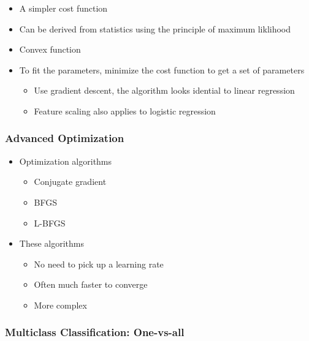 \documentclass[]{article}
\providecommand{\tightlist}{%
  \setlength{\itemsep}{0pt}\setlength{\parskip}{0pt}}
\begin{document}
\begin{itemize}
\tightlist
\item
  A simpler cost function
\end{itemize}

\begin{itemize}
\item
  Can be derived from statistics using the principle of maximum
  liklihood
\item
  Convex function
\item
  To fit the parameters, minimize the cost function to get a set of
  parameters

  \begin{itemize}
  \tightlist
  \item
    Use gradient descent, the algorithm looks idential to linear
    regression
  \item
    Feature scaling also applies to logistic regression
  \end{itemize}
\end{itemize}

\hypertarget{advanced-optimization}{%
\subsubsection{Advanced Optimization}\label{advanced-optimization}}

\begin{itemize}
\tightlist
\item
  Optimization algorithms

  \begin{itemize}
  \tightlist
  \item
    Conjugate gradient
  \item
    BFGS
  \item
    L-BFGS
  \end{itemize}
\item
  These algorithms

  \begin{itemize}
  \tightlist
  \item
    No need to pick up a learning rate
  \item
    Often much faster to converge
  \item
    More complex
  \end{itemize}
\end{itemize}

\hypertarget{multiclass-classification-one-vs-all}{%
\subsubsection{Multiclass Classification:
One-vs-all}\label{multiclass-classification-one-vs-all}}
\end{document}
